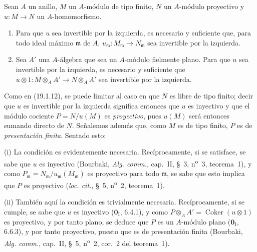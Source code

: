 \begin{proposition}[19.1.14]
\label{0.19.1.14-fr}
Sean $A$ un anillo, $M$ un $A$-módulo de tipo finito, $N$ un $A$-módulo
proyectivo y $u:M\to N$ un $A$-homomorfismo.
\begin{enumerate}
  \item[\textup{(i)}] Para que $u$ sea invertible por la izquierda, es necesario y
  suficiente que, para todo ideal máximo $\mathfrak m$ de $A$,
  $u_{\mathfrak m}:M_{\mathfrak m}\to N_{\mathfrak m}$ sea invertible por la
  izquierda.
  \item[\textup{(ii)}] Sea $A'$ una $A$-álgebra que sea un $A$-módulo fielmente plano.
  Para que $u$ sea invertible por la izquierda, es necesario y suficiente que
  $u\otimes1:M\otimes_AA'\to N\otimes_AA'$ sea invertible por la izquierda.
\end{enumerate}
\end{proposition}

Como en (19.1.12), se puede limitar al caso en que $N$ es libre de tipo finito;
decir que $u$ es invertible por la izquierda significa entonces que $u$ es
inyectivo y que el módulo cociente $P=N/u(M)$ es \emph{proyectivo}, pues
$u(M)$ será entonces sumando directo de $N$. Señalemos además que, como $M$ es
de tipo finito, $P$ es de \emph{presentación finita}. Sentado esto:

(i) La condición es evidentemente necesaria. Recíprocamente, si se satisface,
se sabe que $u$ es inyectivo (Bourbaki, \emph{Alg. comm.}, cap.~II, §~3,
n\textsuperscript{o}~3, teorema~1), y como
$P_{\mathfrak m}=N_{\mathfrak m}/u_{\mathfrak m}(M_{\mathfrak m})$ es
proyectivo para todo $\mathfrak m$, se sabe que esto implica que $P$ es
proyectivo (\emph{loc. cit.}, §~5, n\textsuperscript{o}~2, teorema~1).

(ii) También aquí la condición es trivialmente necesaria. Recíprocamente, si
se cumple, se sabe que $u$ es inyectivo ($\mathbf{0}_{\mathrm I}$, 6.4.1), y
como $P\otimes_AA'=\operatorname{Coker}(u\otimes1)$ es proyectivo, y por tanto
plano, se deduce que $P$ es un $A$-módulo plano
($\mathbf{0}_{\mathrm I}$, 6.6.3), y por tanto proyectivo, puesto que es de
presentación finita (Bourbaki, \emph{Alg. comm.}, cap.~II, §~5,
n\textsuperscript{o}~2, cor.~2 del teorema~1).


